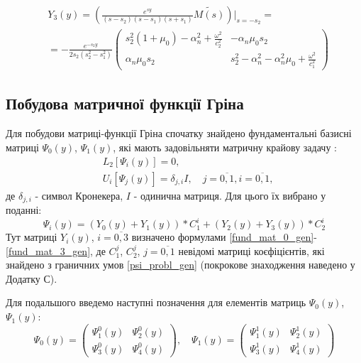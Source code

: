 \begin{align}\label{fund_mat_3_gen}
    &Y_3(y) =  \left( \frac{e^{sy}}{(s-s_2)(s - s_1)(s + s_1)} \widetilde{M(s)} \right) \Big|_{s=-s_2} = \nonumber \\
    &=-\frac{e^{-s_2 y}}{2s_2 (s_2^2 - s_1^2)} \begin{pmatrix}
        s_2^2 (1 + \mu_0) -\alpha_n^2 + \frac{\omega^2}{c_2^2} & -\alpha_n \mu_0 s_2 \\
        \alpha_n \mu_0 s_2 & s_2^2 - \alpha_n^2 - \alpha_n^2\mu_0 + \frac{\omega^2}{c_1^2}
    \end{pmatrix}
\end{align}

\subsection{Побудова матричної функції Гріна}
Для побудови матриці-функції Гріна спочатку знайдено фундаментальні базисні матриці $\Psi_0(y)$, $\Psi_1(y)$, які мають задовільняти матричну крайову задачу \cite{popov_2}:
\begin{align}\label{psi_probl_gen}
    &L_2\left[ \Psi_i(y) \right] = 0, \nonumber \\
    &U_i\left[ \Psi_j(y) \right] = \delta_{j,i}I, \quad j= \overline{0, 1}, i= \overline{0, 1},
\end{align}
де $\delta_{j,i}$ - символ Кронекера, $I$ - одинична матриця.
Для цього їх вибрано у поданні:
\begin{equation}\label{psi_gen}
    \Psi_i(y) = \left( Y_0(y) + Y_1(y) \right) * C_1^i + \left( Y_2(y) + Y_3(y) \right) * C_2^i
\end{equation}
Тут матриці $Y_i(y)$, $i=\overline{0, 3}$ визначено формулами \eqref{fund_mat_0_gen}-\eqref{fund_mat_3_gen}, де $C_1^j$, $C_2^j$, $j=\overline{0, 1}$ невідомі матриці коєфіцієнтів, які знайдено з граничних умов \eqref{psi_probl_gen}
(покрокове знаходження наведено у Додатку С).

Для подальшого введемо наступні позначення для елементів матриць $\Psi_0(y)$, $\Psi_1(y)$:
\begin{equation*}
    \Psi_0(y) = \begin{pmatrix}
        \Psi_1^0(y) &  \Psi_2^0(y) \\
        \Psi_3^0(y) &  \Psi_4^0(y) 
    \end{pmatrix}, \quad 
    \Psi_1(y) = \begin{pmatrix}
        \Psi_1^1(y) &  \Psi_2^1(y) \\
        \Psi_3^1(y) &  \Psi_4^1(y) 
    \end{pmatrix}      
\end{equation*}

